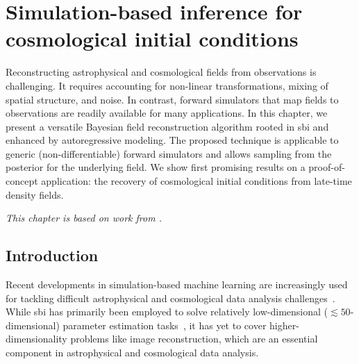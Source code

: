 \chapter{Simulation-based inference for cosmological initial conditions} \label{cha:cosmo}

Reconstructing astrophysical and cosmological fields from observations is challenging. It requires accounting for non-linear transformations, mixing of spatial structure, and noise. In contrast, forward simulators that map fields to observations are readily available for many applications. In this chapter, we present a versatile Bayesian field reconstruction algorithm rooted in \gls*{sbi} and  enhanced by autoregressive modeling. The proposed technique is applicable to generic (non-differentiable) forward simulators and allows sampling from the posterior for the underlying field. We show first promising results on a proof-of-concept application: the recovery of cosmological initial conditions from late-time density fields.

\textit{This chapter is based on work from \cite{List:2023aa}.}


\section{Introduction} \label{sec:cosmo-intro}

Recent developments in simulation-based machine learning are increasingly used for tackling difficult astrophysical and cosmological data analysis challenges~\cite[\eg,][]{Mishra-Sharma:2021oxe,
Cole:2021gwr, Alvey:2023npw, AnauMontel:2023stj, AnauMontel:2022ppb, Montel:2022fhv, Alsing:2017var, Alsing:2019dvb, Alsing:2019xrx, Makinen:2021nly, Modi:2023drt, Modi:2023llw, Barrue:2023ysk, Heinrich:2023bmt, Lin:2022ayr, Gagnon-Hartman:2023soa, Poh:2022ife, Lemos:2022kua, Brehmer:2019jyt, Alvey:2023naa, Bhardwaj:2023xph, Alvey:2023pkx, Karchev:2022xyn, Crisostomi:2023tle, Campeau-Poirier:2023kqd, Coogan:2022cky, Hahn:2022wgo, Jeffrey:2020aa, Saxena:2023tue}.
While \gls*{sbi} has primarily been employed to solve relatively low-dimensional ($\lesssim 50$-dimensional) parameter estimation tasks~\cite{AnauMontel:2023stj, Alvey:2023naa, Alsing:2019xrx}, it has yet to cover higher-dimensionality problems like image reconstruction, which are an essential component in astrophysical and cosmological data analysis. 

